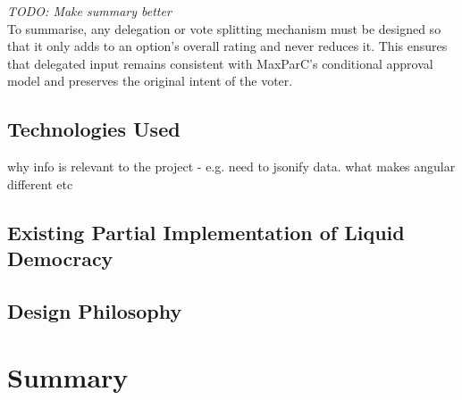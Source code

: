 \textit{TODO: Make summary better} \\
To summarise, any delegation or vote splitting mechanism must be designed so that it only adds to an option's overall rating and never reduces it. This ensures that delegated input remains consistent with MaxParC's conditional approval model and preserves the original intent of the voter.
\subsection{Technologies Used}
why info is relevant to the project - e.g. need to jsonify data. what makes angular different etc
\subsection{Existing Partial Implementation of Liquid Democracy}
\subsection{Design Philosophy}
\section{Summary}


